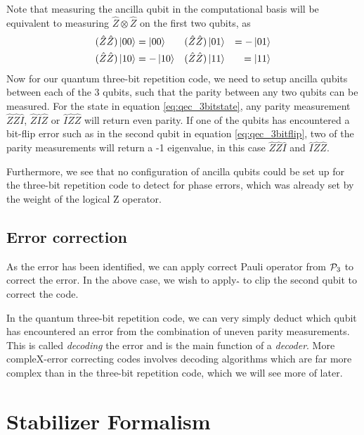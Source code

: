 Note that measuring the ancilla qubit in the computational basis will be equivalent to measuring $\hat{Z}\otimes \hat{Z}$ on the first two qubits, as
\begin{equation}
\begin{aligned}
    (\hat{Z}\hat{Z})\ket{00} &= \ket{00} && (\hat{Z}\hat{Z})\ket{01} &= -\ket{01} \\
    (\hat{Z}\hat{Z})\ket{10} &= -\ket{10} && (\hat{Z}\hat{Z})\ket{11} &= \ket{11}
\end{aligned}
\end{equation}
Now for our quantum three-bit repetition code, we need to setup ancilla qubits between each of the 3 qubits, such that the parity between any two qubits can be measured. For the state in equation \eqref{eq:qec_3bitstate}, any parity measurement $\hat{Z}\hat{Z}\hat{I}$, $\hat{Z}\hat{I}\hat{Z}$ or $\hat{I}\hat{Z}\hat{Z}$ will return even parity. If one of the qubits has encountered a bit-flip error such as in the second qubit in equation \eqref{eq:qec_3bitflip}, two of the parity measurements will return a -1 eigenvalue, in this case $\hat{Z}\hat{Z}\hat{I}$ and $\hat{I}\hat{Z}\hat{Z}$.

Furthermore, we see that no configuration of ancilla qubits could be set up for the three-bit repetition code to detect for phase errors, which was already set by the weight of the logical Z operator.

\subsection{Error correction}

As the error has been identified, we can apply correct Pauli operator from $\mathcal{P}_3$ to correct the error. In the above case, we wish to apply $\hat{}\hat{}\hat{}$ to clip the second qubit to correct the code.

In the quantum three-bit repetition code, we can very simply deduct which qubit has encountered an error from the combination of uneven parity measurements. This is called \emph{decoding} the error and is the main function of a \emph{decoder}. More compleX-error correcting codes involves decoding algorithms which are far more complex than in the three-bit repetition code, which we will see more of later.


\section{Stabilizer Formalism}\label{sec:stabilizerformalism}

